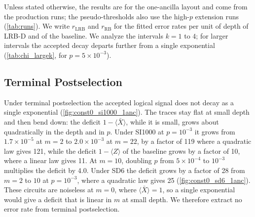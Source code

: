 
Unless stated otherwise, the results are for the one-ancilla layout and come from the production runs; the pseudo-thresholds also use the high-$p$ extension runs (\autoref{tab:runs}). We write $r_{\mathrm{LRB}}$ and $r_{\mathrm{RB}}$ for the fitted error rates per unit of depth of LRB-D and of the baseline. We analyze the intervals $k = 1$ to $4$; for larger intervals the accepted decay departs further from a single exponential (\autoref{tab:chi_largek}, for $p = 5\times10^{-3}$).

\subsection{Terminal Postselection}
\label{sub:terminal_results}

Under terminal postselection the accepted logical signal does not decay as a single exponential (\autoref{fig:const0_si1000_1anc}). The traces stay flat at small depth and then bend down: the deficit $1 - \langle \bar{X} \rangle$, while it is small, grows about quadratically in the depth and in $p$. Under SI1000 at $p = 10^{-3}$ it grows from $1.7\times10^{-5}$ at $m = 2$ to $2.0\times10^{-3}$ at $m = 22$, by a factor of 119 where a quadratic law gives 121, while the deficit $1 - \langle Z \rangle$ of the baseline grows by a factor of 10, where a linear law gives 11. At $m = 10$, doubling $p$ from $5\times10^{-4}$ to $10^{-3}$ multiplies the deficit by 4.0. Under SD6 the deficit grows by a factor of 28 from $m = 2$ to $10$ at $p = 10^{-3}$, where a quadratic law gives 25 (\autoref{fig:const0_sd6_1anc}). These circuits are noiseless at $m = 0$, where $\langle \bar{X} \rangle = 1$, so a single exponential would give a deficit that is linear in $m$ at small depth. We therefore extract no error rate from terminal postselection.

